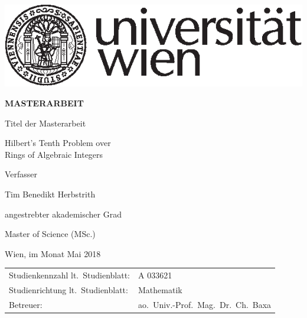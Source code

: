 
\begin{titlepage}
\begin{flushright}
    \includegraphics{uni-logo}
\end{flushright}
\vspace{1cm}

\begin{center}  %
    \Huge{\textsf{\textbf{\MakeUppercase{
        Masterarbeit
    }}}}
    \vspace{2cm}

    \large{\textsf{  %
        Titel der Masterarbeit
    }}
    \vspace{.1cm}

    \LARGE{\textsf{ Hilbert's Tenth Problem over\\
                    Rings of Algebraic Integers
    }}
    \vspace{2.5cm}

    \large{\textsf{  %
        Verfasser
    }}

    \Large{\textsf{  Tim Benedikt Herbstrith
    }}
    \vspace{3cm}

    \large{\textsf{
        angestrebter akademischer Grad  %
    }}

    \Large{\textsf{  %
        Master of Science (MSc.)
    }}
\end{center}
\vspace{2cm}

\noindent\textsf{Wien, im Monat Mai 2018}  %
\vfill

\noindent\begin{tabular}{@{}ll}
\textsf{Studienkennzahl lt.\ Studienblatt:}
&
\textsf{A 033621}  %
\\
\textsf{Studienrichtung lt.\ Studienblatt:}
&
\textsf{Mathematik}  %
\\
\textsf{Betreuer: }
&
\textsf{ao.~Univ.-Prof.~Mag.~Dr.~Ch.~Baxa}  %
\end{tabular}

\end{titlepage}

